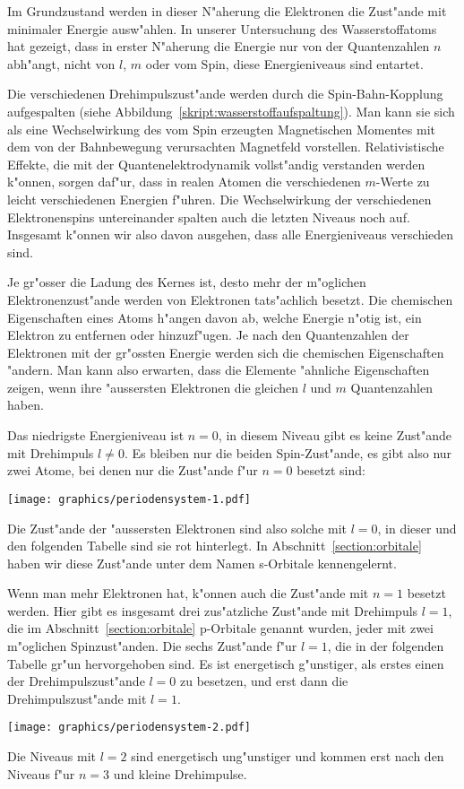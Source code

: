 Im Grundzustand werden in dieser N"aherung die Elektronen die Zust"ande
mit minimaler Energie ausw"ahlen.
In unserer Untersuchung des Wasserstoffatoms hat gezeigt, dass in
erster N"aherung die Energie nur von der Quantenzahlen $n$ abh"angt,
nicht von $l$, $m$ oder vom Spin, diese Energieniveaus sind entartet.

Die verschiedenen Drehimpulszust"ande werden durch die Spin-Bahn-Kopplung
aufgespalten (siehe Abbildung~\ref{skript:wasserstoffaufspaltung}).
Man kann sie sich als eine Wechselwirkung des vom Spin erzeugten
Magnetischen Momentes mit dem von der Bahnbewegung verursachten
Magnetfeld vorstellen.
Relativistische Effekte, die mit der Quantenelektrodynamik vollst"andig
verstanden werden k"onnen, sorgen daf"ur, dass in realen Atomen
die verschiedenen $m$-Werte zu leicht verschiedenen Energien f"uhren.
Die Wechselwirkung der verschiedenen Elektronenspins untereinander
spalten auch die letzten Niveaus noch auf.
Insgesamt k"onnen wir also davon ausgehen, dass alle Energieniveaus
verschieden sind.

Je gr"osser die Ladung des Kernes ist, desto mehr der m"oglichen
Elektronenzust"ande werden von Elektronen tats"achlich besetzt.
Die chemischen Eigenschaften eines Atoms h"angen davon ab, welche
Energie n"otig ist, ein Elektron zu entfernen oder hinzuzf"ugen.
Je nach den Quantenzahlen der Elektronen mit der gr"ossten Energie
werden sich die chemischen Eigenschaften "andern.
Man kann also erwarten, dass die Elemente "ahnliche Eigenschaften
zeigen, wenn ihre "aussersten Elektronen die gleichen $l$ und $m$
Quantenzahlen haben.

Das niedrigste Energieniveau ist $n=0$, in diesem Niveau gibt es
keine Zust"ande mit Drehimpuls $l\ne 0$. Es bleiben nur die
beiden Spin-Zust"ande, es gibt also nur zwei Atome, bei denen nur
die Zust"ande f"ur $n=0$ besetzt sind:
\begin{center}
\texttt{[image: graphics/periodensystem-1.pdf]}
\end{center}
Die Zust"ande der "aussersten Elektronen sind also solche mit
$l=0$, in dieser und den folgenden Tabelle sind sie rot
hinterlegt.
In Abschnitt~\ref{section:orbitale} haben wir diese Zust"ande unter
dem Namen s-Orbitale kennengelernt.

Wenn man mehr Elektronen hat, k"onnen auch die Zust"ande mit $n=1$ 
besetzt werden.
Hier gibt es insgesamt drei zus"atzliche Zust"ande mit Drehimpuls $l=1$,
die im Abschnitt~\ref{section:orbitale} p-Orbitale genannt wurden,
jeder mit zwei m"oglichen Spinzust"anden.
Die sechs Zust"ande f"ur $l=1$, die in der folgenden Tabelle 
gr"un hervorgehoben sind.
Es ist energetisch g"unstiger, als erstes einen der
Drehimpulszust"ande $l=0$ zu besetzen, und erst dann die Drehimpulszust"ande
mit $l=1$.
\begin{center}
\texttt{[image: graphics/periodensystem-2.pdf]}
\end{center}
Die Niveaus mit $l=2$
sind energetisch ung"unstiger
und kommen erst nach
den Niveaus f"ur $n=3$ und kleine Drehimpulse.

